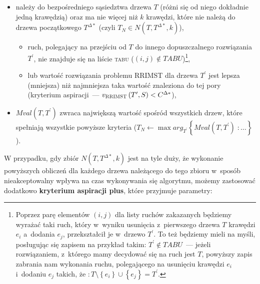 \begin{itemize}
	\item należy do bezpośredniego sąsiedztwa drzewa $T$ (różni się od niego dokładnie jedną krawędzią) oraz ma nie więcej niż $k$ krawędzi, które nie należą do drzewa początkowego $T^{\Delta\ast}$ (czyli $T_{N} \in N \left( T, T^{\Delta\ast}, k \right)$),
	\begin{itemize}
		\item ruch, polegający na przejściu od $T$ do innego dopuszczalnego rozwiązania $T^{\prime}$, nie znajduje się na liście \textsc{tabu} ($\left( i, j \right) \notin TABU$)\footnote{
			Poprzez parę elementów $\left( i, j \right)$ dla listy ruchów zakazanych będziemy wyrażać taki ruch, który w~wyniku usunięcia z~pierwszego drzewa $T$ krawędzi $e_{i}$ a~dodania $e_{j}$, przekształcił je w~drzewo $T^{\prime}$.
			To też będziemy mieli na myśli, posługując się zapisem na przykład takim: $T^{\prime} \notin TABU$~--- jeżeli rozwiązaniem, z~którego mamy decydować się na ruch jest $T$, powyższy zapis zabrania nam wykonania ruchu, polegającego na usunięciu krawędzi $e_{i}$ i~dodaniu $e_{j}$ takich, że $: T \setminus \left\{ e_{i} \right\} \cup \left\{ e_{j} \right\} = T^{\prime}$.
		},
		\item lub wartość rozwiązania problemu \textsc{RRIMST} dla drzewa $T^{\prime}$ jest lepsza (mniejsza) niż najmniejsza taka wartość znaleziona do tej pory (kryterium aspiracji~--- $v_{\textsc{RRIMST}} \left( T^{\prime}, S \right) < C^{\Delta\ast}$), 
	\end{itemize}
	\item $Mval \left( T, T^{\prime} \right)$ zwraca największą wartość spośród wszystkich drzew, które spełniają wszystkie powyższe kryteria ($T_{N} \leftarrow \max arg_{T^{\prime}} \left\{ Mval \left( T, T^{\prime} \right) \; : \dots \right\}$).
\end{itemize}

W przypadku, gdy zbiór $N \left( T, T^{\Delta\ast}, k \right)$ jest na tyle duży, że wykonanie powyższych obliczeń dla każdego drzewa należącego do tego zbioru w~sposób nieakceptowalny wpływa na czas wykonywania się algorytmu, możemy zastosować dodatkowo \textbf{kryterium aspiracji plus}, które przyjmuje parametry:

